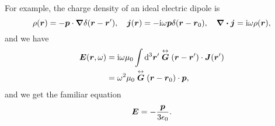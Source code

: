 \documentclass[hyperref, a4paper]{article}
\newcommand*{\ii}{\mathrm{i}}
\renewcommand{\tensor}[1]{ \stackrel{\leftrightarrow}{\vb*{#1}}}
\begin{document}
For example, the charge density of an ideal electric dipole is 
\begin{equation}
    \rho(\vb*{r}) = - \vb*{p} \cdot \grad \delta(\vb*{r} - \vb*{r}'), \quad \vb*{j}(\vb*{r}) = - \ii \omega \vb*{p} \delta(\vb*{r} - \vb*{r}_0), \quad \div{\vb*{j}} = \ii \omega \rho(\vb*{r}),
\end{equation}
and we have 
\[
    \begin{aligned}
        \vb*{E}(\vb*{r}, \omega) &= \ii \omega \mu_0 \int \dd[3]{\vb*{r}'} \tensor{G}(\vb*{r} - \vb*{r}') \cdot \vb*{J}(\vb*{r}') \\
        &= \omega^2 \mu_0 \tensor{G}(\vb*{r} - \vb*{r}_0) \cdot \vb*{p},
    \end{aligned}
\]
and we get the familiar equation
\begin{equation}
    \vb*{E} = - \frac{\vb*{p}}{3 \epsilon_0}.
\end{equation}
\end{document}
